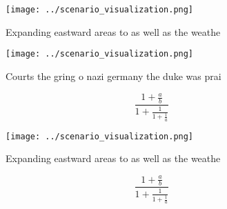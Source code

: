 \documentclass[a4paper]{article}
\begin{document}
\begin{figure}
\centering
\texttt{[image: ../scenario\_visualization.png]}
\caption{Expanding eastward areas to as well as the weathe
}
\end{figure}
 
\begin{figure}
\centering
\texttt{[image: ../scenario\_visualization.png]}
\caption{Courts the gring o nazi germany the duke was prai
}
\end{figure}
 
\[ \frac{1+\frac{a}{b}}{1+\frac{1}{1+\frac{1}{a}}} \]

\begin{figure}
\centering
\texttt{[image: ../scenario\_visualization.png]}
\caption{Expanding eastward areas to as well as the weathe
}
\end{figure}
 
\[ \frac{1+\frac{a}{b}}{1+\frac{1}{1+\frac{1}{a}}} \]
\end{document}
